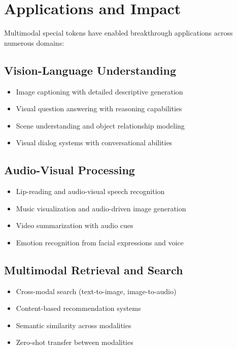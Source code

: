 \section{Applications and Impact}

Multimodal special tokens have enabled breakthrough applications across numerous domains:

\subsection{Vision-Language Understanding}
\begin{itemize}
\item Image captioning with detailed descriptive generation
\item Visual question answering with reasoning capabilities
\item Scene understanding and object relationship modeling
\item Visual dialog systems with conversational abilities
\end{itemize}

\subsection{Audio-Visual Processing}
\begin{itemize}
\item Lip-reading and audio-visual speech recognition
\item Music visualization and audio-driven image generation
\item Video summarization with audio cues
\item Emotion recognition from facial expressions and voice
\end{itemize}

\subsection{Multimodal Retrieval and Search}
\begin{itemize}
\item Cross-modal search (text-to-image, image-to-audio)
\item Content-based recommendation systems
\item Semantic similarity across modalities
\item Zero-shot transfer between modalities
\end{itemize}

\begin{comment}
Feedback: Important, all above sections need enough reference support. Do research, put them in the top level bib file, and ref in the relevant sections above.
\end{comment}
